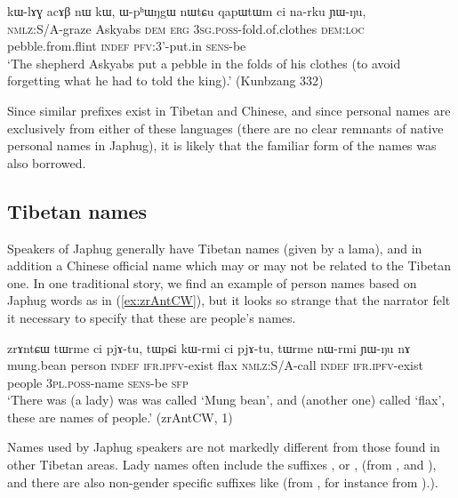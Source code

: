  \begin{exe}
\ex \label{ex:kWlAGacAB.nW.kW}
\gll kɯ-lɤɣ acɤβ nɯ kɯ, ɯ-pʰɯŋgɯ nɯtɕu qapɯtɯm ci na-rku ɲɯ-ŋu, \\
\textsc{nmlz}:S/A-graze Askyabs \textsc{dem} \textsc{erg} \textsc{3sg}.\textsc{poss}-fold.of.clothes \textsc{dem:loc} pebble.from.flint \textsc{indef} \textsc{pfv}:3'-put.in \textsc{sens}-be \\
\glt `The shepherd Askyabs put a pebble in the folds of his clothes (to avoid forgetting what he had to told the king).'  (Kunbzang 332)
\end{exe}

Since similar  prefixes exist in Tibetan and Chinese, and since personal names are exclusively from either of these languages (there are no clear remnants of native personal names in Japhug), it is likely that the familiar form of the names was also borrowed.

\subsection{Tibetan names} \label{sec:names.tibet}
Speakers of Japhug generally have Tibetan names (given by a lama), and in addition a Chinese official name which may or may not be related to the Tibetan one. In one traditional story, we find an example of person names based on Japhug words as in (\ref{ex:zrAntCW}), but it looks so strange that the narrator felt it necessary to specify that these are people's names.

\begin{exe}
\ex  \label{ex:zrAntCW}
 \gll zrɤntɕɯ tɯrme ci pjɤ-tu, tɯpɕi kɯ-rmi ci pjɤ-tu, tɯrme nɯ-rmi ɲɯ-ŋu nɤ \\
mung.bean person \textsc{indef} \textsc{ifr}.\textsc{ipfv}-exist flax \textsc{nmlz}:S/A-call  \textsc{indef} \textsc{ifr}.\textsc{ipfv}-exist people  \textsc{3pl}.\textsc{poss}-name \textsc{sens}-be \textsc{sfp} \\
\glt `There was (a lady) was was called `Mung bean', and (another one) called `flax', these are names of people.' (zrAntCW, 1)
\end{exe}

Names used by Japhug speakers are not markedly different from those found in other Tibetan areas. Lady names often include the suffixes ,  or , (from ,  and ), and there are also non-gender specific suffixes like  (from , for instance  from ).). 

